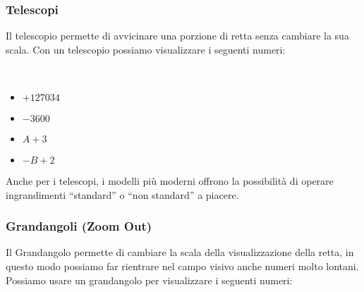 \subsubsection{Telescopi}
\label{subsec:insnum_telescopi}

Il telescopio permette di avvicinare una porzione di retta senza cambiare 
la sua scala. Con un telescopio possiamo visualizzare i seguenti numeri:


\begin{esempio} ~

\begin{multicols}{4}
\begin{itemize}[nosep]
 \item \(+127034\)
 \item \(-3600\)
 \item \(A+3\)
 \item \(-B+2\)
\end{itemize}
\end{multicols}
\vspace{-5mm}

\begin{inaccessibleblock}
\end{inaccessibleblock}
\end{esempio}

Anche per i telescopi, i modelli più moderni offrono la possibilità di 
operare ingrandimenti ``standard'' o ``non standard'' a piacere.

\subsubsection{Grandangoli (Zoom Out)}
\label{subsec:insnum_zoom}

Il Grandangolo permette di cambiare la scala della visualizzazione della 
retta, in questo modo possiamo far rientrare nel campo visivo anche numeri 
molto lontani.
Possiamo usare un grandangolo per visualizzare i seguenti numeri:

